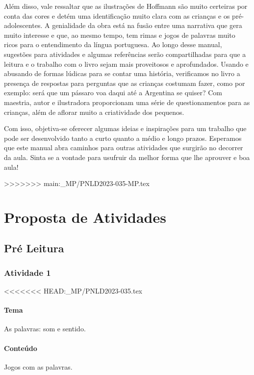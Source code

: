 \documentclass[11pt]{extarticle}
\begin{document}
Além disso, vale ressaltar que as ilustrações de Hoffmann são muito certeiras por conta das cores e detém uma identificação muito clara com as crianças e os pré-adolescentes. A genialidade da obra está na fusão entre uma narrativa que gera muito interesse e que, ao mesmo tempo, tem rimas e jogos de palavras muito ricos para o entendimento da língua portuguesa. Ao longo desse manual, sugestões para atividades e algumas referências serão compartilhadas para que a leitura e o trabalho com o livro sejam mais proveitosos e aprofundados. Usando e abusando de formas lúdicas para se contar uma história, verificamos no livro a presença de respostas para perguntas que as crianças costumam fazer, como por exemplo: será que um pássaro voa daqui até a Argentina se quiser? Com maestria, autor e ilustradora proporcionam uma série de questionamentos para as crianças, além de aflorar muito a criatividade dos pequenos. 

Com isso, objetiva-se oferecer algumas ideias e inspirações para um trabalho que pode ser desenvolvido tanto a curto quanto a médio e longo prazos. Esperamos que este manual abra caminhos para outras atividades que surgirão no decorrer da aula. Sinta se a vontade para usufruir da melhor forma que lhe aprouver e boa aula!

>>>>>>> main:_MP/PNLD2023-035-MP.tex

\section{Proposta de Atividades}
\subsection{Pré Leitura}
\subsubsection{Atividade 1}


<<<<<<< HEAD:_MP/PNLD2023-035.tex
\paragraph{Tema} As palavras: som e sentido. 

\paragraph{Conteúdo} Jogos com as palavras. 
\end{document}
